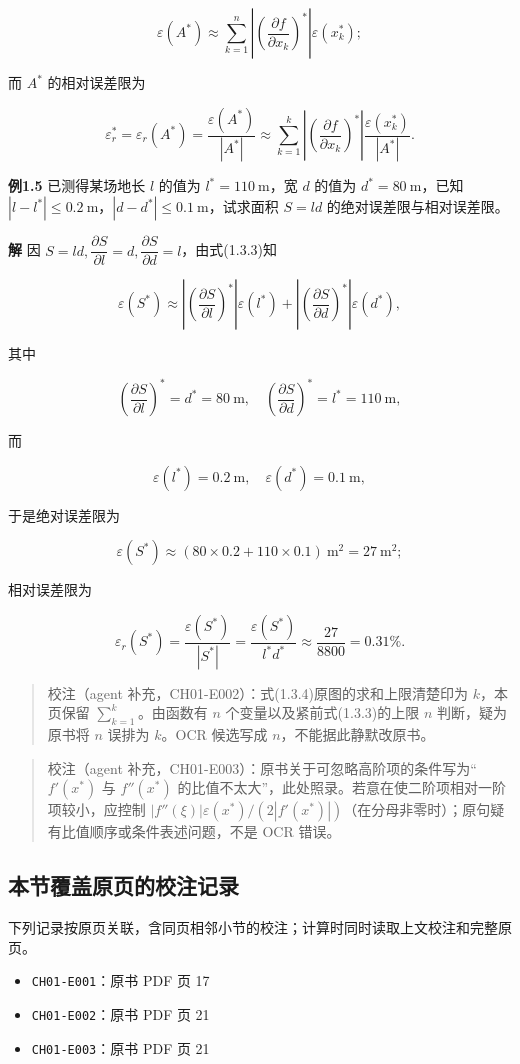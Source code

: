 \documentclass[
  10pt,
  fontset=fandol]{ctexart}
\providecommand{\tightlist}{%
  \setlength{\itemsep}{0pt}\setlength{\parskip}{0pt}}
\begin{document}
\[
\varepsilon(A^*)\approx\sum_{k=1}^{n}\left|\left(\frac{\partial f}{\partial x_k}\right)^*\right|\varepsilon(x_k^*);
\tag{1.3.3}
\]

而 \(A^*\) 的相对误差限为

\[
\varepsilon_r^*=\varepsilon_r(A^*)=\frac{\varepsilon(A^*)}{|A^*|}\approx\sum_{k=1}^{k}\left|\left(\frac{\partial f}{\partial x_k}\right)^*\right|\frac{\varepsilon(x_k^*)}{|A^*|}.
\tag{1.3.4}
\]

\textbf{例1.5} 已测得某场地长 \(l\) 的值为 \(l^*=110\ \mathrm{m}\)，宽 \(d\) 的值为 \(d^*=80\ \mathrm{m}\)，已知 \(|l-l^*|\leqslant 0.2\ \mathrm{m}\)，\(|d-d^*|\leqslant 0.1\ \mathrm{m}\)，试求面积 \(S=ld\) 的绝对误差限与相对误差限。

\textbf{解} 因 \(S=ld,\dfrac{\partial S}{\partial l}=d,\dfrac{\partial S}{\partial d}=l\)，由式(1.3.3)知

\[
\varepsilon(S^*)\approx\left|\left(\frac{\partial S}{\partial l}\right)^*\right|\varepsilon(l^*)+\left|\left(\frac{\partial S}{\partial d}\right)^*\right|\varepsilon(d^*),
\]

其中

\[
\left(\frac{\partial S}{\partial l}\right)^*=d^*=80\ \mathrm{m},\quad
\left(\frac{\partial S}{\partial d}\right)^*=l^*=110\ \mathrm{m},
\]

而

\[
\varepsilon(l^*)=0.2\ \mathrm{m},\quad\varepsilon(d^*)=0.1\ \mathrm{m},
\]

于是绝对误差限为

\[
\varepsilon(S^*)\approx(80\times0.2+110\times0.1)\ \mathrm{m}^2=27\ \mathrm{m}^2;
\]

相对误差限为

\[
\varepsilon_r(S^*)=\frac{\varepsilon(S^*)}{|S^*|}=\frac{\varepsilon(S^*)}{l^*d^*}\approx\frac{27}{8800}=0.31\%.
\]

\begin{quote}
校注（agent 补充，CH01-E002）：式(1.3.4)原图的求和上限清楚印为 \(k\)，本页保留 \(\sum_{k=1}^{k}\)。由函数有 \(n\) 个变量以及紧前式(1.3.3)的上限 \(n\) 判断，疑为原书将 \(n\) 误排为 \(k\)。OCR 候选写成 \(n\)，不能据此静默改原书。
\end{quote}

\begin{quote}
校注（agent 补充，CH01-E003）：原书关于可忽略高阶项的条件写为``\(f'(x^*)\) 与 \(f''(x^*)\) 的比值不太大''，此处照录。若意在使二阶项相对一阶项较小，应控制 \(|f''(\xi)|\varepsilon(x^*)/(2|f'(x^*)|)\)（在分母非零时）；原句疑有比值顺序或条件表述问题，不是 OCR 错误。
\end{quote}

\subsection{本节覆盖原页的校注记录}\label{ux672cux8282ux8986ux76d6ux539fux9875ux7684ux6821ux6ce8ux8bb0ux5f55}

下列记录按原页关联，含同页相邻小节的校注；计算时同时读取上文校注和完整原页。

\begin{itemize}
\tightlist
\item
  \texttt{CH01-E001}：原书 PDF 页 17
\item
  \texttt{CH01-E002}：原书 PDF 页 21
\item
  \texttt{CH01-E003}：原书 PDF 页 21
\end{itemize}
\end{document}
